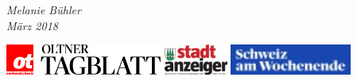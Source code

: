 \documentclass[ngerman,a4paper,11pt]{scrreprt}
\date{\today}
\title{}
\begin{document}
\begin{titlepage}
  \setlength{\fboxsep}{50pt}
  \setlength{\fboxrule}{3pt}

  \vfill
  \vfill

  \begin{minipage}{\textwidth}
    \begin{center}
      \vspace*{4cm}
    \end{center}
  \end{minipage}

  \vfill

  \begin{minipage}{\textwidth}
    \begin{center}
      \Large{\textit{Melanie Bühler}}\\
      \Large{\textit{März 2018}}\\
    \end{center}
  \end{minipage}

  \vfill

  \begin{minipage}{\textwidth}
    \begin{center}
      \includegraphics[height=1cm]{Bilder/Logo/Oltnertagblatt[1].jpg}
      \quad
      \includegraphics[height=1cm]{Bilder/Logo/5658_2_Stadtanzeiger_Olten_Schrift[1].jpg}
      \quad
      \includegraphics[height=1cm]{Bilder/Logo/18021_2_SaW_Logo_V2_cmyk[1].jpg}
    \end{center}
  \end{minipage}

\end{titlepage}
\end{document}
